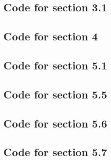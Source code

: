 \documentclass[11pt]{article}
\newcommand{\mfile}[1]  {{\small }} %
\begin{document}
\subsection{Code for section 3.1}\label{code:q31}
\mfile{Q3_1.py}

\subsection{Code for section 4}\label{code:q4}
\mfile{Q4.py}


\subsection{Code for section 5.1}\label{code:q51}
\mfile{Q5_1.py}
\subsection{Code for section 5.5}\label{code:q55}
\mfile{Q5_5.py}
\subsection{Code for section 5.6}\label{code:q56}
\mfile{Q5_6.py}

\subsection{Code for section 5.7}\label{code:q57}
\mfile{Q5_7.py}
\end{document}
